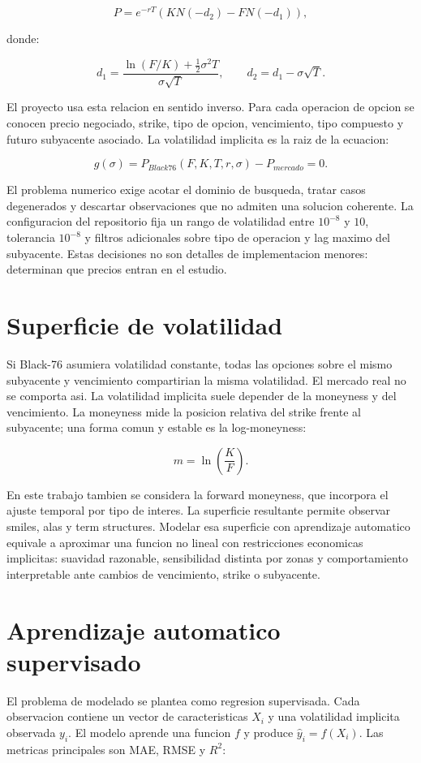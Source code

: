 \[
P=e^{-rT}\left(KN(-d_2)-FN(-d_1)\right),
\]

donde:

\[
d_1=\frac{\ln(F/K)+\frac{1}{2}\sigma^2T}{\sigma\sqrt{T}}, \qquad
d_2=d_1-\sigma\sqrt{T}.
\]

El proyecto usa esta relacion en sentido inverso. Para cada operacion de opcion se conocen precio negociado, strike, tipo de opcion, vencimiento, tipo compuesto y futuro subyacente asociado. La volatilidad implicita es la raiz de la ecuacion:

\[
g(\sigma)=P_{Black76}(F,K,T,r,\sigma)-P_{mercado}=0.
\]

El problema numerico exige acotar el dominio de busqueda, tratar casos degenerados y descartar observaciones que no admiten una solucion coherente. La configuracion del repositorio fija un rango de volatilidad entre $10^{-8}$ y $10$, tolerancia $10^{-8}$ y filtros adicionales sobre tipo de operacion y lag maximo del subyacente. Estas decisiones no son detalles de implementacion menores: determinan que precios entran en el estudio.

\section{Superficie de volatilidad}

Si Black-76 asumiera volatilidad constante, todas las opciones sobre el mismo subyacente y vencimiento compartirian la misma volatilidad. El mercado real no se comporta asi. La volatilidad implicita suele depender de la moneyness y del vencimiento. La moneyness mide la posicion relativa del strike frente al subyacente; una forma comun y estable es la log-moneyness:

\[
m=\ln\left(\frac{K}{F}\right).
\]

En este trabajo tambien se considera la forward moneyness, que incorpora el ajuste temporal por tipo de interes. La superficie resultante permite observar smiles, alas y term structures. Modelar esa superficie con aprendizaje automatico equivale a aproximar una funcion no lineal con restricciones economicas implicitas: suavidad razonable, sensibilidad distinta por zonas y comportamiento interpretable ante cambios de vencimiento, strike o subyacente.

\section{Aprendizaje automatico supervisado}

El problema de modelado se plantea como regresion supervisada. Cada observacion contiene un vector de caracteristicas $X_i$ y una volatilidad implicita observada $y_i$. El modelo aprende una funcion $f$ y produce $\hat{y}_i=f(X_i)$. Las metricas principales son MAE, RMSE y $R^2$:

